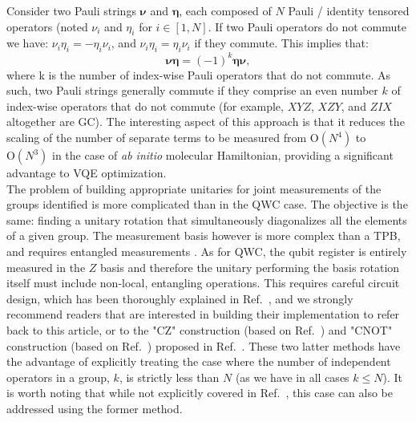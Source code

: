 Consider two Pauli strings $\boldsymbol{\nu}$ and $\boldsymbol{\eta}$, each composed of $N$ Pauli / identity tensored operators (noted $\nu_i$ and $\eta_i$ for $i \in [1, N]$. If two Pauli operators do not commute we have: $\nu_i\eta_i = - \eta_i\nu_i$, and  $\nu_i\eta_i = \eta_i\nu_i$ if they commute. This implies that:
\begin{equation}
    \boldsymbol{\nu}\boldsymbol{\eta} = (-1)^k \boldsymbol{\eta}\boldsymbol{\nu},
\end{equation}
where k is the number of index-wise Pauli operators that do not commute. As such, two Pauli strings generally commute if they comprise an even number $k$ of index-wise operators that do not commute (for example, $XYZ$, $XZY$, and $ZIX$ altogether are GC). The interesting aspect of this approach is that it reduces the scaling of the number of separate terms to be measured from $\mathrm{O}(N^4)$ to $\mathrm{O}(N^3)$ \cite{Gokhale2019_short, Yen2020, Jena2019} in the case of \textit{ab initio} molecular Hamiltonian, providing a significant advantage to VQE optimization. \\

The problem of building appropriate unitaries for joint measurements of the groups identified is more complicated than in the QWC case. The objective is the same: finding a unitary rotation that simultaneously diagonalizes all the elements of a given group. The measurement basis however is more complex than a TPB, and requires entangled measurements \cite{Hamamura2020}. As for QWC, the qubit register is entirely measured in the $Z$ basis and therefore the unitary performing the basis rotation itself must include non-local, entangling operations. This requires careful circuit design, which has been thoroughly explained in Ref.~\cite{Gokhale2019_long}, and we strongly recommend readers that are interested in building their implementation to refer back to this article, or to the "CZ" construction (based on Ref.~\cite{VandenNest2004}) and "CNOT" construction (based on Ref.~\cite{Aaronson2004, Patel2008}) proposed in Ref.~\cite{Crawford2021}. These two latter methods have the advantage of explicitly treating the case where the number of independent operators in a group, $k$, is strictly less than $N$ (as we have in all cases  $k \leqslant N$). It is worth noting that while not explicitly covered in Ref.~\cite{Gokhale2019_long}, this case can also be addressed using the former method.

